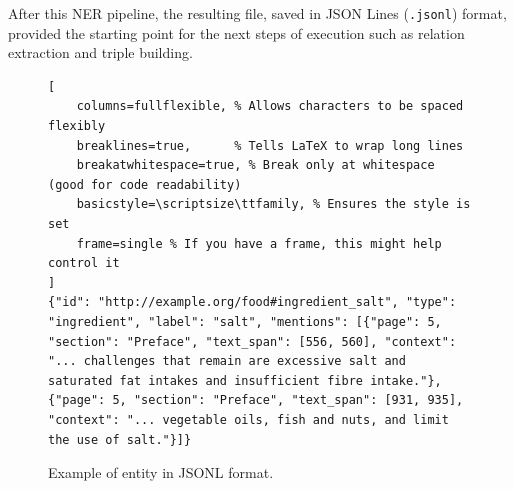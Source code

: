 After this NER pipeline, the resulting file, saved in JSON Lines (\texttt{.jsonl}) format, provided the starting point for the next steps of execution such as relation extraction and triple building.

\begin{figure}[h!]
\centering
\scriptsize
\begin{lstlisting}[
    columns=fullflexible, % Allows characters to be spaced flexibly
    breaklines=true,      % Tells LaTeX to wrap long lines
    breakatwhitespace=true, % Break only at whitespace (good for code readability)
    basicstyle=\scriptsize\ttfamily, % Ensures the style is set
    frame=single % If you have a frame, this might help control it
]
{"id": "http://example.org/food#ingredient_salt", "type": "ingredient", "label": "salt", "mentions": [{"page": 5, "section": "Preface", "text_span": [556, 560], "context": "... challenges that remain are excessive salt and saturated fat intakes and insufficient fibre intake."}, {"page": 5, "section": "Preface", "text_span": [931, 935], "context": "... vegetable oils, fish and nuts, and limit the use of salt."}]}
\end{lstlisting}
\caption{Example of entity in JSONL format.}
\label{fig:entity_example}
\end{figure}

